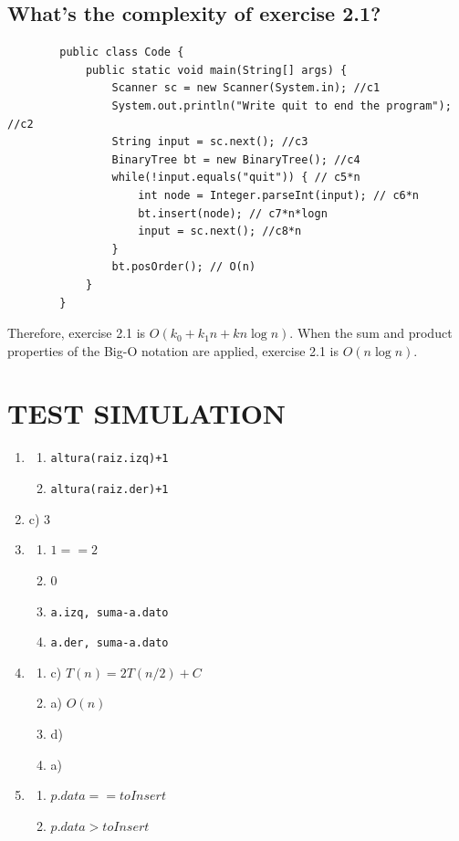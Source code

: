 \documentclass[a4paper,12pt]{article}
\begin{document}
    \subsection{What's the complexity of exercise 2.1?}
      \begin{Verbatim}
        public class Code {
            public static void main(String[] args) {
                Scanner sc = new Scanner(System.in); //c1
                System.out.println("Write quit to end the program"); //c2
                String input = sc.next(); //c3
                BinaryTree bt = new BinaryTree(); //c4
                while(!input.equals("quit")) { // c5*n
                    int node = Integer.parseInt(input); // c6*n
                    bt.insert(node); // c7*n*logn
                    input = sc.next(); //c8*n
                }
                bt.posOrder(); // O(n)
            }
        }
      \end{Verbatim}
      Therefore, exercise 2.1 is $O(k_0+k_1n+kn\log{n})$. When the sum and product
      properties of the Big-O notation are applied, exercise 2.1 is $O(n\log{n})$.

  \section{TEST SIMULATION}
    \begin{multicols}{2}
    \begin{enumerate}
      \item \begin{enumerate}
        \item \texttt{altura(raiz.izq)+1}
        \item \texttt{altura(raiz.der)+1}
    \end{enumerate}
      \item c) 3
      \item \begin{enumerate}
          \item $1 == 2$
          \item 0
          \item \texttt{a.izq, suma-a.dato}
          \item \texttt{a.der, suma-a.dato}
    \end{enumerate}
      \item \begin{enumerate}
        \item c) $T(n)=2T(n/2)+C$
        \item a) $O(n)$
        \item d)
        \item a)
    \end{enumerate}
      \item \begin{enumerate}
          \item $p.data == toInsert$
          \item $p.data > toInsert$
    \end{enumerate}
    \end{enumerate}
  \end{multicols}
\end{document}
